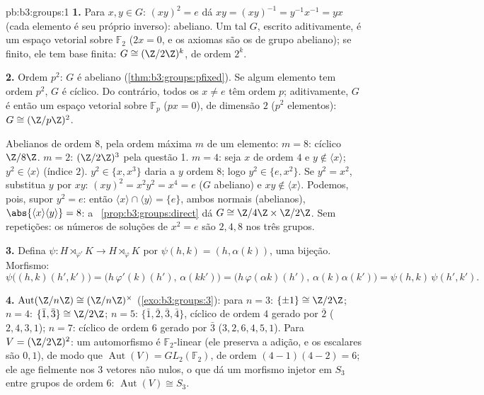 \begin{solution}{pb:b3:groups:1}
\textbf{1.} Para $x, y \in G$: $(xy)^2 = e$ dá $xy = (xy)^{-1} =
y^{-1}x^{-1} = yx$ (cada elemento é seu próprio
inverso): abeliano. Um tal $G$, escrito aditivamente, é um espaço
vetorial sobre $\mathbb
F_2$ ($2x = 0$, e os axiomas são os de grupo
abeliano); se finito, ele tem base finita: $G \cong (\Z/2\Z)^k$, de ordem $2^k$.

\textbf{2.} Ordem $p^2$: $G$ é abeliano (\cref{thm:b3:groups:pfixed}). Se
algum elemento tem ordem $p^2$, $G$ é cíclico. Do contrário,
todos os $x \neq e$ têm ordem $p$; aditivamente, $G$ é então um espaço
vetorial sobre $\mathbb F_p$ ($px = 0$), de dimensão $2$ ($p^2$
elementos): $G \cong (\Z/p\Z)^2$.

Abelianos de ordem $8$, pela ordem máxima $m$ de um elemento:
$m =
8$: cíclico $\Z/8\Z$. $m = 2$: $(\Z/2\Z)^3$ pela questão 1.
$m = 4$: seja $x$ de ordem $4$ e $y \notin \langle x \rangle$; $y^2 \in
\langle x\rangle$ (índice
$2$). $y^2 \in \{x, x^3\}$ daria a $y$ ordem $8$; logo $y^2 \in \{e, x^2\}$. Se $y^2 = x^2$,
substitua $y$ por $xy$: $(xy)^2 = x^2y^2 = x^4 = e$ ($G$ abeliano) e $xy \notin
\langle x\rangle$. Podemos,
pois, supor $y^2 = e$: então $\langle x
\rangle \cap \langle y \rangle = \{e\}$, ambos normais (abelianos), $\abs{\langle x\rangle \langle y\rangle} = 8$: a
~\cref{prop:b3:groups:direct} dá $G \cong \Z/4\Z \times \Z/2\Z$. Sem repetições: os números de soluções de
$x^2 = e$ são $2, 4, 8$ nos três grupos.

\textbf{3.} Defina $\psi \colon H \rtimes_{\varphi'} K \to H
\rtimes_{\varphi} K$ por $\psi(h, k) = (h, \alpha(k))$, uma bijeção. Morfismo:
\[
\psi\bigl((h,k)(h',k')\bigr)
= \bigl(h\,\varphi'(k)(h'),\, \alpha(kk')\bigr)
= \bigl(h\,\varphi(\alpha k)(h'),\, \alpha(k)\alpha(k')\bigr)
= \psi(h,k)\,\psi(h',k').
\]

\textbf{4.} $\operatorname{Aut}(\Z/n\Z) \cong (\Z/n\Z)^\times$ (\cref{exo:b3:groups:3}): para $n = 3$: $\{\pm 1\} \cong \Z/2\Z$;
$n = 4$: $\{\bar 1, \bar 3\} \cong \Z/2\Z$; $n = 5$: $\{\bar 1,
\bar 2, \bar 3, \bar 4\}$, cíclico de ordem $4$ gerado
por $\bar
2$ ($2, 4, 3, 1$); $n = 7$: cíclico de ordem $6$ gerado
por $\bar
3$ ($3, 2, 6, 4, 5, 1$). Para $V = (\Z/2\Z)^2$: um automorfismo é $\mathbb F_2$-linear (ele
preserva a adição, e os escalares são $0,
1$), de modo que $\operatorname{Aut}(V) = GL_2(\mathbb F_2)$, de
ordem $(4-1)(4-2) = 6$; ele age fielmente nos $3$ vetores não nulos, o que dá um
morfismo injetor em $S_3$ entre grupos de ordem $6$: $\operatorname{Aut}(V) \cong S_3$.


\end{solution}
